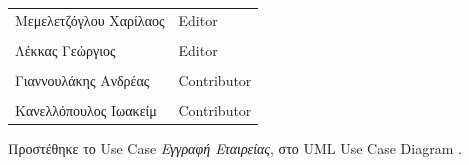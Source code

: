 \documentclass{../ol-softwaremanual}
\begin{document}
	
	\vspace{20pt}
	
	\begin{table}[htbp!]
		\begin{tabular}{ll}
			Μεμελετζόγλου Χαρίλαος & \en Editor \\
			\\ Λέκκας Γεώργιος      &   \en  Editor \\
			\\ Γιαννουλάκης Ανδρέας & \en Contributor \\
			\\ Κανελλόπουλος Ιωακείμ & \en Contributor \\ 
		\end{tabular}
	\end{table}


	\vspace{10pt}
	
	Προστέθηκε το \en Use Case \gr \textit{Εγγραφή Εταιρείας}, στο \en UML Use Case Diagram \gr.
	
\end{document}
